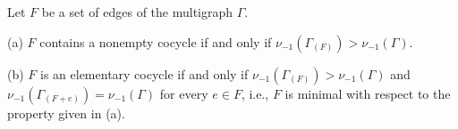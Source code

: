 Let $F$ be a set of edges of the multigraph $\Gamma$.

(a) $F$ contains a nonempty cocycle if and only if $\nu_{-1}(\Gamma_{(F)}) > \nu_{-1}(\Gamma)$.

(b) $F$ is an elementary cocycle if and only if $\nu_{-1}(\Gamma_{(F)}) > \nu_{-1}(\Gamma)$ and $\nu_{-1}(\Gamma_{(F+e)}) = \nu_{-1}(\Gamma)$ for every $e \in F$, i.e., $F$ is minimal with respect to the property given in (a).
